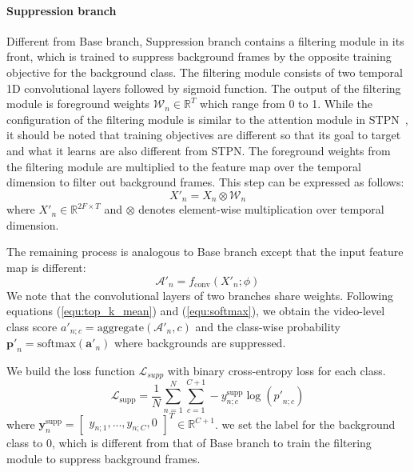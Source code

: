 \documentclass[letterpaper]{article} %
\newcommand{\R}{\mathbb{R}}
\begin{document}
\paragraph{Suppression branch}
Different from Base branch, Suppression branch contains a filtering module in its front, which is trained to suppress background frames by the opposite training objective for the background class. The filtering module consists of two temporal 1D convolutional layers followed by sigmoid function. The output of the filtering module is foreground weights $\mathcal{W}_{n}\in\R^{T}$ which range from 0 to 1. While the configuration of the filtering module is similar to the attention module in STPN~\cite{nguyen2018weakly}, it should be noted that training objectives are different so that its goal to target and what it learns are also different from STPN.
The foreground weights from the filtering module are multiplied to the feature map over the temporal dimension to filter out background frames. This step can be expressed as follows:
\begin{equation}
  \label{equ:filtering}
  {X'}_{n} = {X}_{n} \otimes \mathcal{W}_{n}
\end{equation}
where ${X'}_{n} \in \mathbb{R}^{2F \times T}$ and ${\otimes}$ denotes element-wise multiplication over temporal dimension.

The remaining process is analogous to Base branch except that the input feature map is different:
\begin{equation}
  \label{equ:filtered_cas}
  \mathcal{A'}_{n} = f_{\text{conv}}(X'_{n}; \phi)
\end{equation}
We note that the convolutional layers of two branches share weights. Following equations (\ref{equ:top_k_mean}) and (\ref{equ:softmax}), we obtain the video-level class score ${a'}_{n;c}=\text{aggregate}(\mathcal{A'}_{n}, c)$ and the class-wise probability $\mathbf{p'}_{n}=\text{softmax}(\mathbf{a'}_{n})$ where backgrounds are suppressed. 

We build the loss function $\mathcal{L}_{supp}$ with binary cross-entropy loss for each class.
\begin{equation}
  \label{equ:loss_supp}
  \mathcal{L}_{\text{supp}} = \frac{1}{N}\sum_{n=1}^{N}\sum_{c=1}^{C+1}-y^{\text{supp}}_{n;c}\log({p'}_{n;c})
\end{equation}
where $\mathbf{y}^{\text{supp}}_{n} = \begin{bmatrix}y_{n;1}, ..., y_{n;C}, 0\end{bmatrix}^{T} \in \mathbb{R}^{C+1}$.
we set the label for the background class to $0$, which is different from that of Base branch to train the filtering module to suppress background frames.
\end{document}
